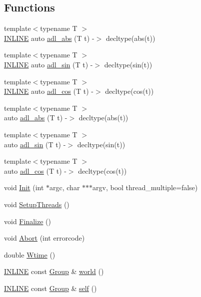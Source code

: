 \subsection*{Functions}
\begin{DoxyCompactItemize}
\item 
{\footnotesize template$<$typename T $>$ }\\\hyperlink{common_8hpp_a2eb6f9e0395b47b8d5e3eeae4fe0c116}{I\+N\+L\+I\+NE} auto \hyperlink{namespaceshark_a01c919545e5586af9484f058f38774b6}{adl\+\_\+abs} (T t) -\/$>$ decltype(abs(t))
\item 
{\footnotesize template$<$typename T $>$ }\\\hyperlink{common_8hpp_a2eb6f9e0395b47b8d5e3eeae4fe0c116}{I\+N\+L\+I\+NE} auto \hyperlink{namespaceshark_a64eebbcdfd6c5bd1d6358a87dae2a26f}{adl\+\_\+sin} (T t) -\/$>$ decltype(sin(t))
\item 
{\footnotesize template$<$typename T $>$ }\\\hyperlink{common_8hpp_a2eb6f9e0395b47b8d5e3eeae4fe0c116}{I\+N\+L\+I\+NE} auto \hyperlink{namespaceshark_ae60244cfc7c72df7cbd33ab9fb90ff7e}{adl\+\_\+cos} (T t) -\/$>$ decltype(cos(t))
\item 
{\footnotesize template$<$typename T $>$ }\\auto \hyperlink{namespaceshark_abc9eeb27045e8177d53cd2829813cdb7}{adl\+\_\+abs} (T t) -\/$>$ decltype(abs(t))
\item 
{\footnotesize template$<$typename T $>$ }\\auto \hyperlink{namespaceshark_ada90d7cb1a90a692b2c9a2f3cb6cfa5f}{adl\+\_\+sin} (T t) -\/$>$ decltype(sin(t))
\item 
{\footnotesize template$<$typename T $>$ }\\auto \hyperlink{namespaceshark_a310c9d62035abf67cd44771cce04678c}{adl\+\_\+cos} (T t) -\/$>$ decltype(cos(t))
\item 
void \hyperlink{namespaceshark_acb17c538c18f0773515300329c3158e3}{Init} (int $\ast$argc, char $\ast$$\ast$$\ast$argv, bool thread\+\_\+multiple=false)
\item 
void \hyperlink{namespaceshark_aa4284bb4a0880374f13b0928c18d2143}{Setup\+Threads} ()
\item 
void \hyperlink{namespaceshark_a3d59270cba11d6b4a4b75c37064cfaf3}{Finalize} ()
\item 
void \hyperlink{namespaceshark_a6a162c31c594f35cb696d65d231e1b5c}{Abort} (int errorcode)
\item 
double \hyperlink{namespaceshark_a4ca07420a22b68c516e9488d2748a578}{Wtime} ()
\item 
\hyperlink{common_8hpp_a2eb6f9e0395b47b8d5e3eeae4fe0c116}{I\+N\+L\+I\+NE} const \hyperlink{classshark_1_1_group}{Group} \& \hyperlink{namespaceshark_a1dc10b4032399f63650dbbb186483e47}{world} ()
\item 
\hyperlink{common_8hpp_a2eb6f9e0395b47b8d5e3eeae4fe0c116}{I\+N\+L\+I\+NE} const \hyperlink{classshark_1_1_group}{Group} \& \hyperlink{namespaceshark_a48a395947ef400bc057cebb8150f7f4e}{self} ()
\end{DoxyCompactItemize}
